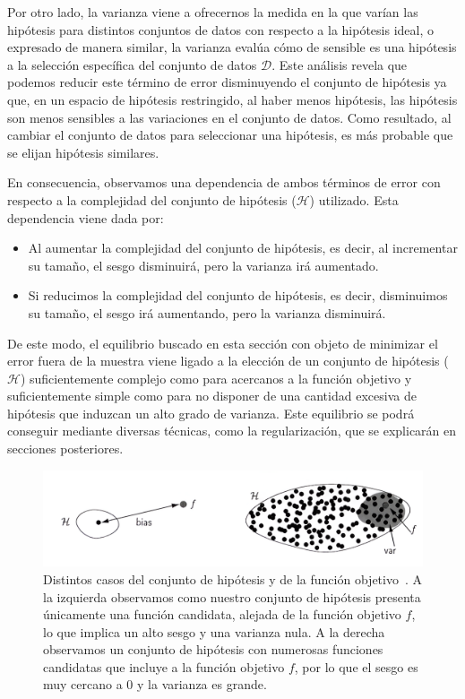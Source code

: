 Por otro lado, la varianza viene a ofrecernos la medida en la que varían las hipótesis para distintos conjuntos de datos con respecto a la hipótesis ideal, o expresado de manera similar, la varianza evalúa cómo de sensible es una hipótesis a la selección específica del conjunto de datos $\mathcal{D}$. Este análisis revela que podemos reducir este término de error disminuyendo el conjunto de hipótesis ya que, en un espacio de hipótesis restringido, al haber menos hipótesis, las hipótesis son menos sensibles a las variaciones en el conjunto de datos. Como resultado, al cambiar el conjunto de datos para seleccionar una hipótesis, es más probable que se elijan hipótesis similares.\newline

En consecuencia, observamos una dependencia de ambos términos de error con respecto a la complejidad del conjunto de hipótesis ($\mathcal{H}$) utilizado. Esta dependencia viene dada por:

\begin{itemize}
    \item Al aumentar la complejidad del conjunto de hipótesis, es decir, al incrementar su tamaño, el sesgo disminuirá, pero la varianza irá aumentado.
    \item Si reducimos la complejidad del conjunto de hipótesis, es decir, disminuimos su tamaño, el sesgo irá aumentando, pero la varianza disminuirá.\newline
\end{itemize}

De este modo, el equilibrio buscado en esta sección con objeto de minimizar el error fuera de la muestra viene ligado a la elección de un conjunto de hipótesis ($\mathcal{H}$) suficientemente complejo como para acercanos a la función objetivo y suficientemente simple como para no disponer de una cantidad excesiva de hipótesis que induzcan un alto grado de varianza. Este equilibrio se podrá conseguir mediante diversas técnicas, como la regularización, que se explicarán en secciones posteriores.\newline

\begin{figure}[h]
    \centering
    \includegraphics[width=0.7\linewidth]{img/bias-variance.png}
    \caption[Distintos casos del conjunto de hipótesis y de la función objetivo.] {Distintos casos del conjunto de hipótesis y de la función objetivo~\cite{Mostafa2012}. A la izquierda observamos como nuestro conjunto de hipótesis presenta únicamente una función candidata, alejada de la función objetivo $f$, lo que implica un alto sesgo y una varianza nula. A la derecha observamos un conjunto de hipótesis con numerosas funciones candidatas que incluye a la función objetivo $f$, por lo que el sesgo es muy cercano a $0$ y la varianza es grande.}\label{fig:bias-variance}
\end{figure}

